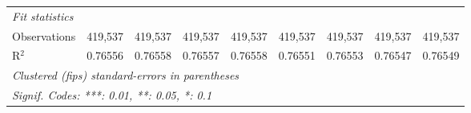 \documentclass{article}
\begin{document}
\begin{appendices}
\begin{table}[htbp]
\begin{tabular}{lcccccccc}
      \midrule
      \emph{Fit statistics}\\
      Observations       & 419,537         & 419,537         & 419,537         & 419,537                & 419,537         & 419,537         & 419,537         & 419,537\\  
      R$^2$              & 0.76556         & 0.76558         & 0.76557         & 0.76558                & 0.76551         & 0.76553         & 0.76547         & 0.76549\\  
      \midrule \midrule
      \multicolumn{9}{l}{\emph{Clustered (fips) standard-errors in parentheses}}\\
      \multicolumn{9}{l}{\emph{Signif. Codes: ***: 0.01, **: 0.05, *: 0.1}}\\
   \end{tabular}
\end{table}

\end{appendices}
\end{document}
